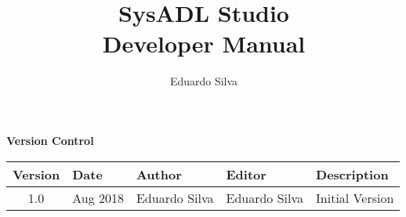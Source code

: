 \documentclass[]{report}
\title{SysADL Studio\\\small{Developer Manual}}
\author{Eduardo Silva}
\begin{document}
\maketitle

\begin{table*}
	\centering
	{\huge{\textbf{Version Control}}}\\
	\vspace{15px}
	\begin{tabular}{c | l | l | l | l }
		\hline
		\textbf{Version} & \textbf{Date} & \textbf{Author} & \textbf{Editor} & \textbf{Description} \\ \hline
		1.0 & Aug 2018 & Eduardo Silva & Eduardo Silva & Initial Version \\
		\hline
	\end{tabular}
\end{table*}

\tableofcontents







\end{document}
